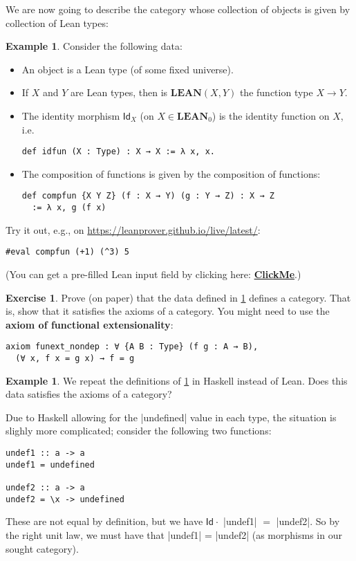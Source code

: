 \documentclass[a4paper,10pt]{scrartcl}
\theoremstyle{plain}
\theoremstyle{definition}
\newtheorem{exa}[thm]{Example}
\newtheorem{exer}[thm]{Exercise}
\newcommand{\cfont}[1]{\ensuremath{\mathsf{#1}}}
\newcommand{\Catb}[1]{\mathbf{#1}}
\newcommand{\LEAN}{\Catb{LEAN}}
\newcommand{\Ob}[1]{{#1}_0}
\newcommand{\CHom}[3]{{#1}(#2,#3)}
\newcommand{\Id}[1][]{\cfont{Id}_{#1}}
\newcommand{\Comp}{\cdot}
\begin{document}
We are now going to describe the category whose collection of objects is given by collection of Lean types:
\begin{exa}\label{exa:lean-cat}
  Consider the following data: 
\begin{itemize}
\item An object is a Lean type (of some fixed universe).
\item If $X$ and $Y$ are Lean types, then is $\CHom \LEAN X Y$ the function type $X\to Y$.
\item The identity morphism $\Id[X]$ (on $X\in \Ob{\LEAN}$) is the identity function on $X$, i.e.
\begin{lstlisting}
def idfun (X : Type) : X → X := λ x, x.
\end{lstlisting}
\item The composition of functions is given by the composition of functions:
\begin{lstlisting}
def compfun {X Y Z} (f : X → Y) (g : Y → Z) : X → Z
  := λ x, g (f x)
\end{lstlisting}
\end{itemize}
  Try it out, e.g., on \url{https://leanprover.github.io/live/latest/}:
\begin{lstlisting}
#eval compfun (+1) (^3) 5
\end{lstlisting}  
(You can get a pre-filled Lean input field by clicking here: \href{https://leanprover.github.io/live/latest/#code=%0Adef%20idfun%20(X%20:%20Type)%20:%20X%20%E2%86%92%20X%20:=%20%CE%BB%20x,%20x.%0Adef%20compfun%20%7BX%20Y%20Z%7D%20(f%20:%20X%20%E2%86%92%20Y)%20(g%20:%20Y%20%E2%86%92%20Z%20)%20:%20X%20%E2%86%92%20Z%0A:=%20%CE%BB%20x%20,%20g%20(%20f%20x%20)%0A%0A#eval%20compfun%20(+1)%20(%5E3)%205}{\textbf{ClickMe}}.)
\end{exa}

\begin{exer}
  Prove (on paper) that the data defined in \cref{exa:lean-cat} defines a category.
  That is, show that it satisfies the axioms of a category.
  You might need to use the \textbf{axiom of functional extensionality}:
\begin{lstlisting}
axiom funext_nondep : ∀ {A B : Type} (f g : A → B), 
  (∀ x, f x = g x) → f = g
\end{lstlisting}
\end{exer}

\begin{exa}
  We repeat the definitions of \cref{exa:lean-cat} in Haskell instead of Lean.
  Does this data satisfies the axioms of a category?

  Due to Haskell allowing for the |undefined| value in each type, the situation is slighly more complicated; consider the following two functions:
\begin{lstlisting}
undef1 :: a -> a
undef1 = undefined

undef2 :: a -> a
undef2 = \x -> undefined
\end{lstlisting}
These are not equal by definition, but we have $\Id \Comp$ |undef1| $=$ |undef2|.
So by the right unit law, we must have that |undef1| = |undef2| (as morphisms in our sought category).
\end{exa}
\end{document}
